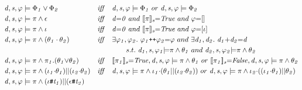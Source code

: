 \documentclass[acmsmall,10pt,review]{acmart}
\newcommand{\es}{\theta}
\newcommand{\ev}{\iota}
\newcommand{\effect}{\textcolor{black}{\ensuremath{\mathrm{\Phi}}}}
\newcommand{\code}[1]{{\tt{\ensuremath{\m{#1}}}}}
\newcommand{\empt}{\textcolor{black}{\ensuremath{\epsilon}}}
\newcommand{\m}{\mathit}
\newcommand{\lappend}{\mathrel{\texttt{++}}}
\newcommand{\mysharp}{{\mathrel{\texttt{\#}}}}
\begin{document}
{\begin{figure}[]
  \vspace{-1mm}
  \renewcommand{\arraystretch}{1.2}
\small\begin{align*}
&\code{d, s, \varphi \models \effect_1 \vee \effect_2}  
&\m{iff}\quad & \code{d, s, \varphi \models \effect_1 } \ 
or\ \code{d, s, \varphi \models \effect_2 }  \\
&\code{d, s,  \varphi \models {\pi} \wedge \empt}  
&\m{iff}\quad & \code{d{=}0}\ and  \ \code{\llbracket {\pi} \rrbracket_s {=}  
{True} } \ and\  \code{ \varphi {=} [] }\\
&\code{d, s, \varphi \models {\pi} \wedge \ev }  
&\m{iff}\quad & \code{d{=}0}\ and  \ \code{\llbracket {\pi} \rrbracket_s {=}  
{True} }\ and \ \varphi {=} [\ev]  \\
&\code{d, s, \varphi \models {\pi} \wedge (\es_1\cdot \es_2)}  
&\m{iff}\quad & \exists \code{\varphi_1,\varphi_2}. \  
\code{ \varphi_1 {\lappend} \varphi_2 {=} \varphi}\ and\ 
\exists \code{d_1,d_2}. \  
\code{ d_1 {+} d_2 {=} d} \\
&&& \qquad  s.t. \ \code{d_1, s, \varphi_1 {\models} {\pi}  \wedge \es_1 }
\ and \ \code{d_2, s, \varphi_2 {\models} {\pi}  \wedge \es_2 }\\
&\code{d, s, \varphi \models {\pi} \wedge \pi_1.(\es_1{\vee}\es_2)}  
&\m{iff}\quad & 
\code{\llbracket \pi_1  \rrbracket_{s} {=}  
 {True} },\code{d, s, \varphi \models {\pi}  \wedge \es_1 } 
\ or\ 
\code{\llbracket \pi_1  \rrbracket_{s} {=}  
 {False} },
\code{d, s, \varphi \models {\pi}  \wedge \es_2 } \\
&\code{d, s, \varphi \models {\pi} \wedge (\ev_1{\cdot}\es_1)||(\ev_2{\cdot}\es_2)}  
&\m{iff}\quad & \code{d, s, \varphi \models {\pi}  \wedge \ev_1{\cdot} (\es_1||(\ev_2{\cdot}\es_2)) } 
\ or\ \code{d, s, \varphi \models {\pi}  \wedge \ev_2{\cdot}((\ev_1{\cdot}\es_1)||\es_2)  } \\
&\code{d, s, \varphi \models {\pi} \wedge (\ev\mysharp t_1) || (\epsilon \mysharp  t_2)}  

\end{align*}
\end{figure}}
\end{document}
